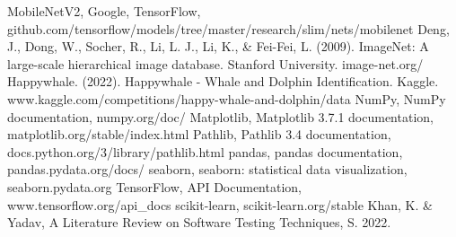 \documentclass[a4paper,final,12pt]{report}
\begin{document}
\begin{thebibliography}{100}
 MobileNetV2, Google, TensorFlow, github.com/tensorflow/models/tree/master/research/slim/nets/mobilenet
 Deng, J., Dong, W., Socher, R., Li, L. J., Li, K., \& Fei-Fei, L. (2009). ImageNet: A large-scale hierarchical image database. Stanford University. image-net.org/
 Happywhale. (2022). Happywhale - Whale and Dolphin Identification. Kaggle. www.kaggle.com/competitions/happy-whale-and-dolphin/data
 NumPy, NumPy documentation, numpy.org/doc/
 Matplotlib, Matplotlib 3.7.1 documentation, matplotlib.org/stable/index.html
 Pathlib, Pathlib 3.4 documentation, docs.python.org/3/library/pathlib.html
 pandas, pandas documentation, pandas.pydata.org/docs/
 seaborn, seaborn: statistical data visualization, seaborn.pydata.org
 TensorFlow, API Documentation, www.tensorflow.org/api\_docs
 scikit-learn, scikit-learn.org/stable
 Khan, K. \& Yadav, A Literature Review on Software Testing Techniques, S. 2022.
\end{thebibliography}
\end{document}
